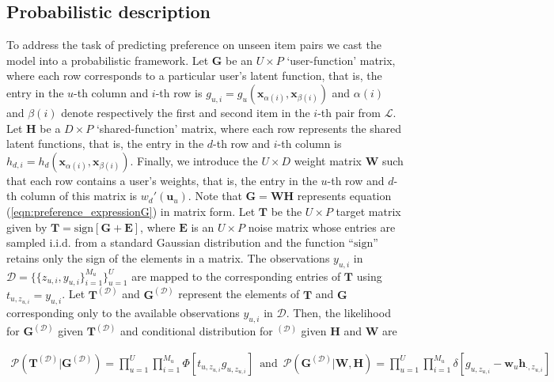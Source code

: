 \subsection{Probabilistic description}

To address the task of predicting preference on unseen item pairs we cast the model into a probabilistic framework. Let $\mathbf{G}$ be an $U\times P$ `user-function' matrix, where each row corresponds to a particular user's latent function, that is, the entry in the $u$-th column and $i$-th row is  $g_{u,i}= g_u(\mathbf{x}_{\alpha(i)},\mathbf{x}_{\beta(i)})$ and $\alpha(i)$ and $\beta(i)$ denote respectively the first and second item in the $i$-th pair from $\mathcal{L}$. Let $\mathbf{H}$ be a $D\times P$ `shared-function' matrix, where each row represents the shared latent functions, that is, the entry in the $d$-th row and $i$-th column is  $h_{d,i}= h_d(\mathbf{x}_{\alpha(i)},\mathbf{x}_{\beta(i)})$. Finally, we introduce the $U \times D$ weight matrix $\mathbf{W}$ such that each row contains a user's weights, that is, the entry in the $u$-th row and $d$-th column of this matrix is $w_d'(\mathbf{u}_u)$. Note that $\mathbf{G} = \mathbf{W} \mathbf{H}$ represents equation (\ref{eqn:preference_expressionG}) in matrix form. Let $\mathbf{T}$ be the $U\times P$ target matrix given by $\mathbf{T} = \text{sign}[\mathbf{G} + \mathbf{E}]$, where $\mathbf{E}$ is an $U \times P$ noise matrix whose entries are sampled i.i.d. from a standard Gaussian distribution and the function ``$\text{sign}$'' retains only the sign of the elements in a matrix.  The observations $y_{u,i}$ in $\mathcal{D}=\{\{z_{u,i},y_{u,i}\}_{i=1}^{M_u}\}_{u=1}^{U}$ are mapped to the corresponding entries of $\mathbf{T}$ using $t_{u,z_{u,i}} = y_{u,i}$. Let $\mathbf{T}^{(\mathcal{D})}$ and $\mathbf{G}^{(\mathcal{D})}$ represent the elements of $\mathbf{T}$ and $\mathbf{G}$ corresponding only to the available observations $y_{u,i}$ in $\mathcal{D}$. Then, the likelihood for $\mathbf{G}^{(\mathcal{D})}$ given $\mathbf{T}^{(\mathcal{D})}$ and conditional distribution for $\mathbf{ }^{(\mathcal{D})}$ given $\mathbf{H}$ and $\mathbf{W}$ are

\begin{align}
	\mathcal{P}(\mathbf{T}^{(\mathcal{D})}|\mathbf{G}^{(\mathcal{D})}) 
	= \prod_{u=1}^U \prod_{i=1}^{M_u} \Phi[t_{u,z_{u,i}} g_{u,z_{u,i}}]\,\,\,\text{and}\,\,\,
	\mathcal{P}(\mathbf{G}^{(\mathcal{D})}|\mathbf{W},\mathbf{H}) = 
	\prod_{u=1}^{U} \prod_{i=1}^{M_u}\delta[g_{u,z_{u,i}}-\mathbf{w}_u\mathbf{h}_{\cdot,z_{u,i}}]\,
\end{align}


